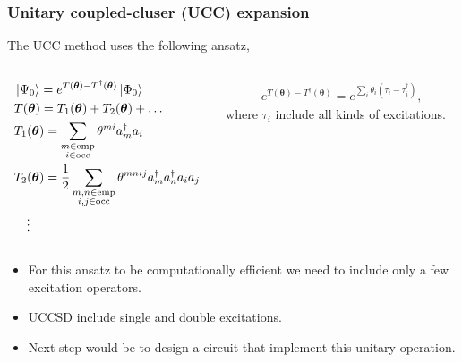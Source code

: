\documentclass{beamer}
\renewcommand{\(}{\left(}
\renewcommand{\)}{\right)}
\renewcommand{\[}{\left[}
\renewcommand{\]}{\right]}
\begin{document}
\begin{frame}
    \frametitle{Unitary coupled-cluser (UCC) expansion}
    The UCC method uses the following ansatz, 
    \begin{columns}
        \begin{column}[]{0.55\textwidth}
            \begin{align*}
                &\ket{\Psi_0} = e^{T(\bm \theta) - T^\dagger (\bm \theta)} \ket{\Phi_0} \\ 
                &T(\bm \theta) = T_1(\bm \theta) + T_2(\bm \theta) + \dots \\ 
                & T_1(\bm \theta) = \sum_{\substack{m\in \text{emp} \\ i \in \text{occ}}} \theta^{mi} a^\dagger_m a_i \\ 
                &T_2(\bm \theta) = \frac{1}{2} \sum_{\substack{m, n\in \text{emp} \\ i, j \in \text{occ}}} \theta^{mnij} a^\dagger_m a^\dagger_n a_i a_j \\
                &  \quad \vdots
            \end{align*}
        \end{column}
        \begin{column}[b]{0.45\textwidth}
            \begin{align*}
                e^{T(\bm \theta) - T^\dagger (\bm \theta)} = e^{\sum_i \theta_i (\tau_i - \tau^\dagger_i)},
            \end{align*}
            where $\tau_i$ include all kinds of excitations. 
        \end{column}
    \end{columns}
    \begin{itemize}
        \item For this ansatz to be computationally efficient we need to include only a few excitation operators. 
        \item UCCSD include single and double excitations.
        \item Next step would be to design a circuit that implement this unitary operation. 
    \end{itemize}
\end{frame}
\end{document}
